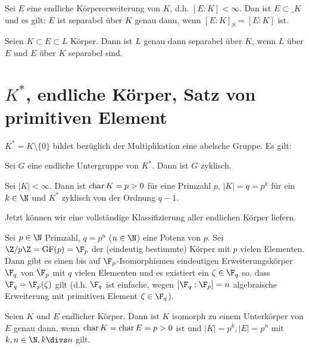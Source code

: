 \begin{st} \label{19.1-19}
	Sei $E$ eine endliche Körpererweiterung von $K$, d.h. $[E : K] < \infty$.
	Dan ist $E \subset \_K$ und es gilt:
	$E$ ist separabel über $K$ genau dann, wenn $[E : K]_S = [E : K]$ ist.
\end{st}

\begin{st} \label{19.1-20}
	Seien $K \subset E \subset L$ Körper.
	Dann ist $L$ genau dann separabel über $K$, wenn $L$ über $E$ und $E$ über $K$ separabel sind.
\end{st}


\section{\texorpdfstring{$K^*$}{K*}, endliche Körper, Satz von primitiven Element}

$K^* = K \setminus \{0\}$ bildet bezüglich der Multiplikation eine abelsche Gruppe.
Es gilt:

\begin{st} \label{19.2-1}
	Sei $G$ eine endliche Untergruppe von $K^*$.
	Dann ist $G$ zyklisch.
\end{st}

\begin{st} \label{19.2-2}
	Sei $|K| < \infty$.
	Dann ist $\operatorname{char} K = p > 0$ für eine Primzahl $p$, $|K| = q = p^k$ für ein $k \in \N$ und $K^*$ zyklisch von der Ordnung $q - 1$.
\end{st}

Jetzt können wir eine vollständige Klassifizierung aller endlichen Körper liefern.

\begin{st} \label{19.2-3}
	Sei $p \in \N$ Primzahl, $q = p^n$ ($n \in \N$) eine Potenz von $p$.
	Sei $\Z / p\Z = \GF(p) = \F_p$ der (eindeutig bestimmte) Körper mit $p$ vielen Elementen.
	Dann gibt es einen bis auf $\F_p$-Isomorphismen eindeutigen Erweiterungskörper $\F_q$ von $\F_p$ mit $q$ vielen Elementen und es existiert ein $\zeta \in \F_q$ so, dass $\F_q = \F_p(\zeta)$ gilt (d.h. $\F_q$ ist einfache, wegen $[\F_q : \F_p] = n$ algebraische Erweiterung mit primitiven Element $\zeta \in \F_q$).
\end{st}

\begin{kor} \label{19.2-4}
	Seien $K$ und $E$ endlicher Körper.
	Dann ist $K$ isomorph zu einem Unterkörper von $E$ genau dann, wenn $\operatorname{char} K = \operatorname{char} E = p > 0$ ist und $|K| = p^k, |E| = p^n$ mit $k, n \in \N, k \divs n$ gilt.
\end{kor}

